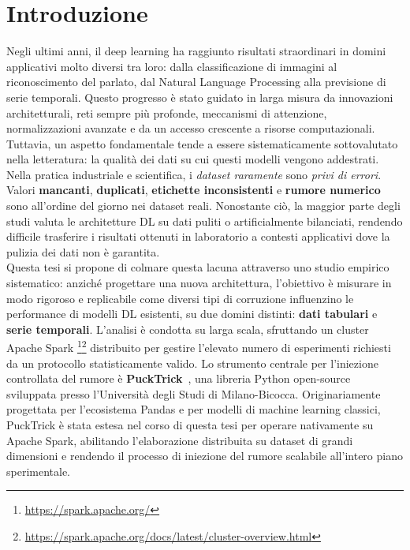 \documentclass[../main.tex]{subfiles}
\begin{document}
\chapter{Introduzione}

\label{chap:Introduction}

Negli ultimi anni, il deep learning ha raggiunto risultati straordinari in domini applicativi molto diversi tra loro: dalla classificazione di immagini al riconoscimento del parlato, dal Natural Language Processing alla previsione di serie temporali. Questo progresso è stato guidato in larga misura da innovazioni architetturali, reti sempre più profonde, meccanismi di attenzione, normalizzazioni avanzate e da un accesso crescente a risorse computazionali. Tuttavia, un aspetto fondamentale tende a essere sistematicamente sottovalutato nella letteratura: la qualità dei dati su cui questi modelli vengono addestrati.
Nella pratica industriale e scientifica, i \textit{dataset raramente} sono \textit{privi di errori}. Valori \textbf{mancanti}, \textbf{duplicati}, \textbf{etichette inconsistenti} e \textbf{rumore numerico} sono all'ordine del giorno nei dataset reali. Nonostante ciò, la maggior parte degli studi valuta le architetture DL su dati puliti o artificialmente bilanciati, rendendo difficile trasferire i risultati ottenuti in laboratorio a contesti applicativi dove la pulizia dei dati non è garantita.\\
Questa tesi si propone di colmare questa lacuna attraverso uno studio empirico sistematico: anziché progettare una nuova architettura, l'obiettivo è misurare in modo rigoroso e replicabile come diversi tipi di corruzione influenzino le performance di modelli DL esistenti, su due domini distinti: \textbf{dati tabulari} e \textbf{serie temporali}. L'analisi è condotta su larga scala, sfruttando un cluster Apache Spark \footnote{\url{https://spark.apache.org/}}\footnote{\url{https://spark.apache.org/docs/latest/cluster-overview.html}} distribuito per gestire l'elevato numero di esperimenti richiesti da un protocollo statisticamente valido.
Lo strumento centrale per l'iniezione controllata del rumore è \textbf{PuckTrick}~\cite{agostini2025pucktricklibrarymakingsynthetic}, una libreria Python open-source sviluppata presso l'Università degli Studi di Milano-Bicocca. Originariamente progettata per l'ecosistema Pandas e per modelli di machine learning classici, PuckTrick è stata estesa nel corso di questa tesi per operare nativamente su Apache Spark, abilitando l'elaborazione distribuita su dataset di grandi dimensioni e rendendo il processo di iniezione del rumore scalabile all'intero piano sperimentale.
\end{document}
